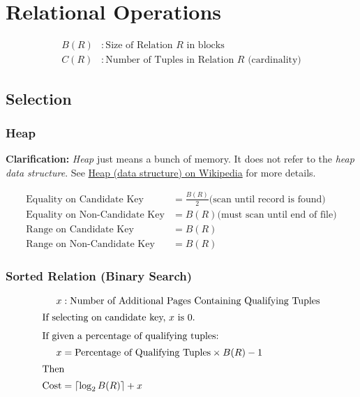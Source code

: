 \documentclass{article}
\newcommand{\ceil}[1]{\left\lceil#1\right\rceil}
\begin{document}
\section{Relational Operations}

\begin{align*}
  B(R) &: \text{Size of Relation \(R\) in blocks} \\
  C(R) &: \text{Number of Tuples in Relation \(R\) (cardinality)}
\end{align*}

\subsection{Selection}

\subsubsection{Heap}

\textbf{Clarification:} \textit{Heap} just means a bunch of memory. It
does not refer to the \textit{heap data structure}. See
\href{http://en.wikipedia.org/wiki/Heap\_(data\_structure)}{Heap (data
  structure) on Wikipedia} for more details.

\begin{align}
  \text{Equality on Candidate Key} &= \frac{B(R)}{2} \text{(scan until record is found)} \\
  \text{Equality on Non-Candidate Key} &= B(R) \text{(must scan until end of file)} \\
  \text{Range on Candidate Key} &= B(R) \\
  \text{Range on Non-Candidate Key} &= B(R)
\end{align}

\subsubsection{Sorted Relation (Binary Search)}
\label{sec:sorted}

\begin{align}
  x &: \text{Number of Additional Pages Containing Qualifying Tuples} \notag \\
  \intertext{If selecting on candidate key, \(x\) is 0.}
  \intertext{If given a percentage of qualifying tuples:}
  x &= \text{Percentage of Qualifying Tuples} \times B(R) - 1 \\
  \intertext{Then}
  \text{Cost} &= \ceil{\log_2B(R)} + x
\end{align}
\end{document}
